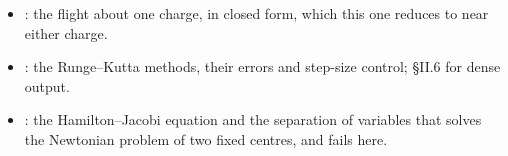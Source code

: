 \documentclass{leveldoc}
\begin{document}
\begin{itemize}
  \item {}: the flight about one charge, in closed form, which this one
    reduces to near either charge.
  \item {}: the Runge--Kutta methods, their errors and step-size control;
    §II.6 for dense output.
  \item {}: the Hamilton--Jacobi equation and the separation of variables that
    solves the Newtonian problem of two fixed centres, and fails here.
\end{itemize}

\levelfileappendix
\end{document}
